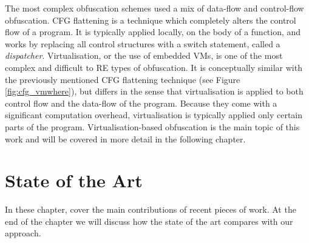 The most complex obfuscation schemes used a mix of data-flow and control-flow obfuscation. \gls{CFG} flattening is a technique which completely alters the control flow of a program. It is typically applied locally, on the body of a function, and works by replacing all control structures with a switch statement, called a \emph{dispatcher}. Virtualisation, or the use of embedded \glspl{VM}, is one of the most complex and difficult to \gls{RE} types of obfuscation. It is conceptually similar with the previously mentioned \gls{CFG} flattening technique (see Figure \ref{fig:cfg_vmwhere}), but differs in the sense that virtualisation is applied to both control flow and the data-flow of the program. Because they come with a significant computation overhead, virtualisation is typically applied only certain parts of the program. Virtualisation-based obfuscation is the main topic of this work and will be covered in more detail in the following chapter.

\chapter{State of the Art}





In these chapter, cover the main contributions of recent pieces of work. At the end of the chapter we will discuss how the state of the art compares with our approach.

